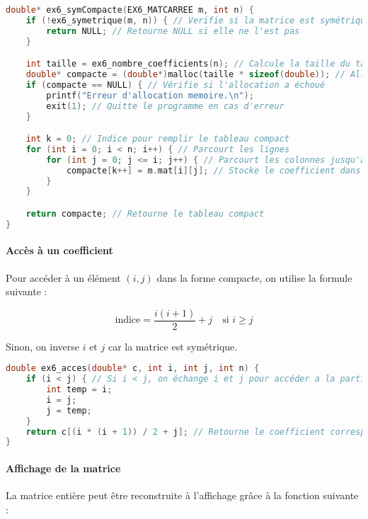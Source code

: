 \documentclass[a4paper,12pt]{article}
\begin{document}
\begin{lstlisting}[language=C, caption={Représentation compacte}]
double* ex6_symCompacte(EX6_MATCARREE m, int n) {
    if (!ex6_symetrique(m, n)) { // Verifie si la matrice est symétrique
        return NULL; // Retourne NULL si elle ne l'est pas
    }

    int taille = ex6_nombre_coefficients(n); // Calcule la taille du tableau compact
    double* compacte = (double*)malloc(taille * sizeof(double)); // Alloue le tableau
    if (compacte == NULL) { // Vérifie si l'allocation a échoué
        printf("Erreur d'allocation memoire.\n");
        exit(1); // Quitte le programme en cas d'erreur
    }

    int k = 0; // Indice pour remplir le tableau compact
    for (int i = 0; i < n; i++) { // Parcourt les lignes
        for (int j = 0; j <= i; j++) { // Parcourt les colonnes jusqu'à la diagonale
            compacte[k++] = m.mat[i][j]; // Stocke le coefficient dans le tableau compact
        }
    }

    return compacte; // Retourne le tableau compact
}
\end{lstlisting}

\paragraph{Accès à un coefficient}

Pour accéder à un élément $(i, j)$ dans la forme compacte, on utilise la formule suivante :

\[
\text{indice} = \frac{i(i+1)}{2} + j \quad \text{si } i \geq j
\]

Sinon, on inverse $i$ et $j$ car la matrice est symétrique.

\begin{lstlisting}[language=C, caption={Accès à un coefficient}]
double ex6_acces(double* c, int i, int j, int n) {
    if (i < j) { // Si i < j, on échange i et j pour accéder a la partie triangulaire inférieure
        int temp = i;
        i = j;
        j = temp;
    }
    return c[(i * (i + 1)) / 2 + j]; // Retourne le coefficient correspondant
}

\end{lstlisting}

\paragraph{Affichage de la matrice}

La matrice entière peut être reconstruite à l'affichage grâce à la fonction suivante :
\end{document}
